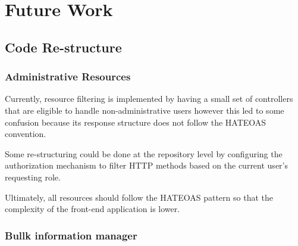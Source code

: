 \chapter{Future Work}


\section{Code Re-structure}
\subsection{Administrative Resources}
Currently, resource filtering is implemented by having a small set of controllers that are eligible to handle non-administrative users however this led to some confusion because its response structure does not follow the \gls{HATEOAS} convention.

Some re-structuring could be done at the repository level by configuring the authorization mechanism to filter \gls{HTTP} methods based on the current user's requesting role.

Ultimately, all resources should follow the \gls{HATEOAS} pattern so that the complexity of the front-end application is lower.

\subsection{Bullk information manager}

\todo{}